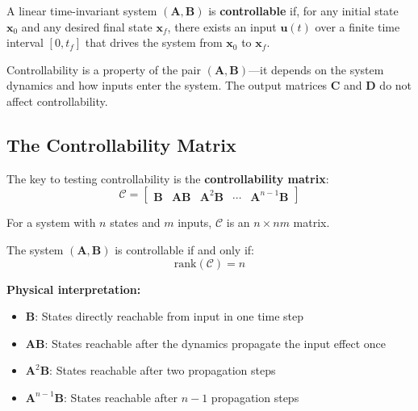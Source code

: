 \begin{definition}[Controllability]
A linear time-invariant system $(\mathbf{A}, \mathbf{B})$ is \textbf{controllable} if, for any initial state $\mathbf{x}_0$ and any desired final state $\mathbf{x}_f$, there exists an input $\mathbf{u}(t)$ over a finite time interval $[0, t_f]$ that drives the system from $\mathbf{x}_0$ to $\mathbf{x}_f$.
\end{definition}

Controllability is a property of the pair $(\mathbf{A}, \mathbf{B})$---it depends on the system dynamics and how inputs enter the system. The output matrices $\mathbf{C}$ and $\mathbf{D}$ do not affect controllability.

\subsection{The Controllability Matrix}

The key to testing controllability is the \textbf{controllability matrix}:
\begin{equation}
\boxed{\mathcal{C} = \begin{bmatrix} \mathbf{B} & \mathbf{A}\mathbf{B} & \mathbf{A}^2\mathbf{B} & \cdots & \mathbf{A}^{n-1}\mathbf{B} \end{bmatrix}}
\label{eq:controllability_matrix}
\end{equation}

For a system with $n$ states and $m$ inputs, $\mathcal{C}$ is an $n \times nm$ matrix.

\begin{theorem}
\label{thm:controllability_rank}
The system $(\mathbf{A}, \mathbf{B})$ is controllable if and only if:
\begin{equation}
\text{rank}(\mathcal{C}) = n
\end{equation}
\end{theorem}

\textbf{Physical interpretation:}
\begin{itemize}
    \item $\mathbf{B}$: States directly reachable from input in one time step
    \item $\mathbf{A}\mathbf{B}$: States reachable after the dynamics propagate the input effect once
    \item $\mathbf{A}^2\mathbf{B}$: States reachable after two propagation steps
    \item $\mathbf{A}^{n-1}\mathbf{B}$: States reachable after $n-1$ propagation steps
\end{itemize}

